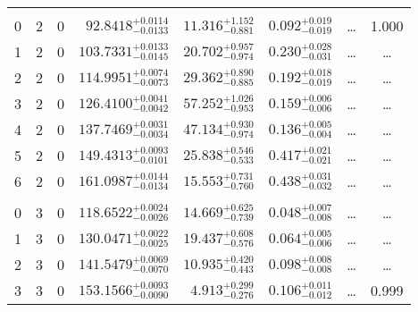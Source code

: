 \begin{table*}[!]
\begin{tabular}{llcrrlrc}
\hline \\[-8pt]
0 & 2 & 0 & $     92.8418_{-      0.0133}^{+      0.0114}$ & $      11.316_{-       0.881}^{+       1.152}$ & $       0.092_{-       0.019}^{+       0.019}$ & \multicolumn{1}{c}{\dots} & 1.000\\[1pt]
1 & 2 & 0 & $    103.7331_{-      0.0145}^{+      0.0133}$ & $      20.702_{-       0.974}^{+       0.957}$ & $       0.230_{-       0.031}^{+       0.028}$ & \multicolumn{1}{c}{\dots} & \dots \\[1pt]
2 & 2 & 0 & $    114.9951_{-      0.0073}^{+      0.0074}$ & $      29.362_{-       0.885}^{+       0.890}$ & $       0.192_{-       0.019}^{+       0.018}$ & \multicolumn{1}{c}{\dots} & \dots \\[1pt]
3 & 2 & 0 & $    126.4100_{-      0.0042}^{+      0.0041}$ & $      57.252_{-       0.953}^{+       1.026}$ & $       0.159_{-       0.006}^{+       0.006}$ & \multicolumn{1}{c}{\dots} & \dots \\[1pt]
4 & 2 & 0 & $    137.7469_{-      0.0034}^{+      0.0031}$ & $      47.134_{-       0.974}^{+       0.930}$ & $       0.136_{-       0.004}^{+       0.005}$ & \multicolumn{1}{c}{\dots} & \dots \\[1pt]
5 & 2 & 0 & $    149.4313_{-      0.0101}^{+      0.0093}$ & $      25.838_{-       0.533}^{+       0.546}$ & $       0.417_{-       0.021}^{+       0.021}$ & \multicolumn{1}{c}{\dots} & \dots \\[1pt]
6 & 2 & 0 & $    161.0987_{-      0.0134}^{+      0.0144}$ & $      15.553_{-       0.760}^{+       0.731}$ & $       0.438_{-       0.032}^{+       0.031}$ & \multicolumn{1}{c}{\dots} & \dots \\[1pt]
\hline \\[-8pt]
0 & 3 & 0 & $    118.6522_{-      0.0026}^{+      0.0024}$ & $      14.669_{-       0.739}^{+       0.625}$ & $       0.048_{-       0.008}^{+       0.007}$ & \multicolumn{1}{c}{\dots} & \dots \\[1pt]
1 & 3 & 0 & $    130.0471_{-      0.0025}^{+      0.0022}$ & $      19.437_{-       0.576}^{+       0.608}$ & $       0.064_{-       0.006}^{+       0.005}$ & \multicolumn{1}{c}{\dots} & \dots \\[1pt]
2 & 3 & 0 & $    141.5479_{-      0.0070}^{+      0.0069}$ & $      10.935_{-       0.443}^{+       0.420}$ & $       0.098_{-       0.008}^{+       0.008}$ & \multicolumn{1}{c}{\dots} & \dots \\[1pt]
3 & 3 & 0 & $    153.1566_{-      0.0090}^{+      0.0093}$ & $       4.913_{-       0.276}^{+       0.299}$ & $       0.106_{-       0.012}^{+       0.011}$ & \multicolumn{1}{c}{\dots} & 0.999\\[1pt]
\hline
\end{tabular}
\end{table*}
